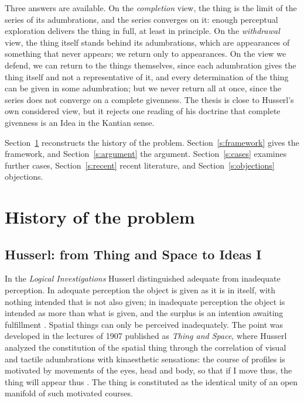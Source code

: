\documentclass{situationist-preprint}
\begin{document}
Three answers are available. On the \emph{completion} view, the thing is the limit of the series of its adumbrations, and the series converges on it: enough perceptual exploration delivers the thing in full, at least in principle. On the \emph{withdrawal} view, the thing itself stands behind its adumbrations, which are appearances of something that never appears; we return only to appearances. On the view we defend, we can return to the things themselves, since each adumbration gives the thing itself and not a representative of it, and every determination of the thing can be given in some adumbration; but we never return all at once, since the series does not converge on a complete givenness. The thesis is close to Husserl's own considered view, but it rejects one reading of his doctrine that complete givenness is an Idea in the Kantian sense.

Section~\ref{s:history} reconstructs the history of the problem. Section~\ref{s:framework} gives the framework, and Section~\ref{s:argument} the argument. Section~\ref{s:cases} examines further cases, Section~\ref{s:recent} recent literature, and Section~\ref{s:objections} objections.

\section{History of the problem}\label{s:history}

\subsection{Husserl: from Thing and Space to Ideas I}

In the \emph{Logical Investigations} Husserl distinguished adequate from inadequate perception. In adequate perception the object is given as it is in itself, with nothing intended that is not also given; in inadequate perception the object is intended as more than what is given, and the surplus is an intention awaiting fulfillment \citep[vol.~2, Sixth Investigation, §§37--39]{Husserl1901}. Spatial things can only be perceived inadequately. The point was developed in the lectures of 1907 published as \emph{Thing and Space}, where Husserl analyzed the constitution of the spatial thing through the correlation of visual and tactile adumbrations with kinaesthetic sensations: the course of profiles is motivated by movements of the eyes, head and body, so that if I move thus, the thing will appear thus \citep{Husserl1973}. The thing is constituted as the identical unity of an open manifold of such motivated courses.
\end{document}
